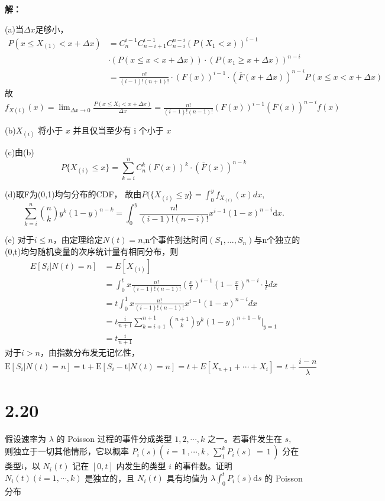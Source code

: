 \documentclass[12pt]{article}
\begin{document}
\textbf{解：}

(a)当\(\Delta x\)足够小，
$$\begin{aligned}
P(x\leq X_{(1)}<x+\Delta x) & =C_{n}^{i-1}C_{n-i+1}^{i-1}C_{n-i}^{n-i}({P(X_{1}<x)})^{i-1} \\
 & \cdot(P(x\leq x<x+\Delta x))\cdot(P(x_{1}\geq x+\Delta x))^{n-i} \\
 & =\frac{n!}{(i-1)!(n+1)!}\cdot(F(x))^{i-1}\cdot(\overline{F}(x+\Delta x))^{n-i}P(x\leq x<x+\Delta x) 
\end{aligned}$$
故$f_{X(i)}(x)=\lim_{\Delta x\to0}\frac{P(x\leq X_{i}<x+\Delta x)}{\Delta x}=\frac{n!}{(i-1)!(n-1)!}(F(x))^{i-1}(\overline{F}(x))^{n-i}f(x)$

(b)$X_{(i)}$ 将小于 $x$ 并且仅当至少有 i 个小于 $x$

(c)由(b)$$P\{X_{(i)}\leq x\}=\sum_{k=i}^{n}C_{n}^{k}(F(x))^{k}\cdot(\overline{F}(x))^{n-k}$$

(d)取F为(0,1)均匀分布的CDF，
故由$P(\{X_{(i)}\leq y\}=\int_{0}^{y}f_{X_{(i)}}(x)dx,$
$$\sum_{k=i}^n\binom{n}{k}y^k\left(1-y\right)^{n-k}=\int_0^y\frac{n!}{\left(i-1\right)!\left(n-i\right)!}x^{i-1}\left(1-x\right)^{n-i}\mathrm{d}x.$$

(e) 对于\(i\le n\)，由定理给定\(N(t)=n\),n个事件到达时间$(S_1,...,S_n)$与n个独立的(0,t)均匀随机变量的次序统计量有相同分布，则
$$\begin{aligned}
 E[S_i|N(t)=n]&=E[X_{(i)}]\\&=\int_{0}^{t}x\frac{n!}{(i-1)!(n-1)!}(\frac{x}{t})^{i-1}(1-\frac{x}{t})^{n-i}\cdot\frac{1}{t}dx\\&=t\int_{0}^{1}x\frac{n!}{(i-1)!(n-1)!}x^{i-1}(1-x)^{n-i}dx  \\ 
 &=t\frac{i}{n+1}\sum_{k=i+1}^{n+1}\binom{n+1}{k}y^{k}(1-y)^{n+1-k}|_{y=1}\\
 &=t\frac{i}{n+1}
\end{aligned}$$
对于\(i>n\)，由指数分布发无记忆性，$$\mathrm{E}[S_i|N(t)=n]=\mathrm{t}+\mathrm{E}[S_i-\mathrm{t}|N(t)=n]=t+E[X_{n+1}+\cdots+X_i]=t+\frac{i-n}{\lambda}$$
\section*{2.20}
假设速率为 $\lambda$ 的 Poisson 过程的事件分成类型 $1, 2, \cdots, k$ 之一。若事件发生在 $s,$ 
则独立于一切其他情形，它以概率 $P_{i} \left( s \right) \left( \, i=\, 1 \,, \cdots, k \,, \, \sum_{1}^{k} P_{i} \left( s \right) \,=\, 1 \, \right)$ 分在类型i，以 $N_{i} ( t )$ 记在 $\left[ 0, t \right]$ 内发生的类型 $i$ 的事件数。证明 $N_{i} \left( t \right) \left( i=1, \cdots, k \right)$ 是独立的，且 $N_{i} ( t )$ 具有均值为 $\lambda\int_{0}^{t} P_{i} \left( s \right) \mathrm{d} s$ 的 Poisson 分布
\end{document}
